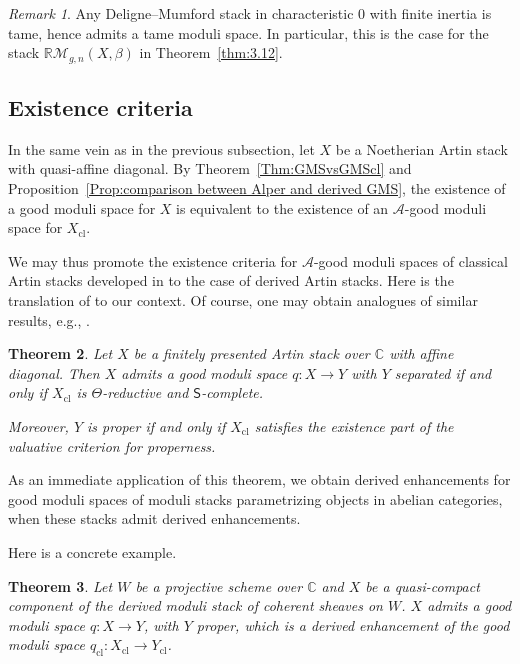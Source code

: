 \documentclass[a4paper,twoside,11pt]{amsart}
\theoremstyle{plain}
\newtheorem{theorem}{Theorem}[section]
\theoremstyle{definition}
\theoremstyle{remark}
\newtheorem{remark}[theorem]{Remark}
\numberwithin{equation}{section}
\newcommand{\CC}{\mathbb{C}} %
\newcommand{\cl}{\mathrm{cl}} %
\newcommand{\mM}{\mathcal{M}}
\begin{document}
\begin{remark} Any Deligne--Mumford stack in characteristic $0$ with finite inertia is tame, hence admits a tame moduli space. In particular, this is the case for the stack $\mathbb{R} \mM_{g,n}(X, \beta)$ in Theorem~\ref{thm:3.12}.
\end{remark}

\subsection{Existence criteria} In the same vein as in the previous subsection, let $X$ be a Noetherian Artin stack with quasi-affine diagonal. By Theorem~\ref{Thm:GMSvsGMScl} and Proposition~\ref{Prop:comparison between Alper and derived GMS}, the existence of a good moduli space for $X$ is equivalent to the existence of an $\mathcal{A}$-good moduli space for $X_\cl$.

We may thus promote the existence criteria for $\mathcal{A}$-good moduli spaces of classical Artin stacks developed in \cite{AlperExistence} to the case of derived Artin stacks. Here is the translation of \cite[Theorem~A]{AlperExistence} to our context. Of course, one may obtain analogues of similar results, e.g., \cite[Theorem~4.1]{AlperExistence}.

\begin{theorem}
Let $X$ be a finitely presented Artin stack over $\CC$ with affine diagonal. Then $X$ admits a good moduli space $q \colon X \to Y$ with $Y$ separated if and only if $X_\cl$ is $\Theta$-reductive and $\mathsf{S}$-complete.

Moreover, $Y$ is proper if and only if $X_\cl$ satisfies the existence part of the valuative criterion for properness.
\end{theorem}

As an immediate application of this theorem, we obtain derived enhancements for good moduli spaces of moduli stacks parametrizing objects in abelian categories, when these stacks admit derived enhancements. 

Here is a concrete example.

\begin{theorem}
Let $W$ be a projective scheme over $\CC$ and $X$ be a quasi-compact component of the derived moduli stack of coherent sheaves on $W$. $X$ admits a good moduli space $q \colon X \to Y$, with $Y$ proper, which is a derived enhancement of the good moduli space $q_\cl \colon X_\cl \to Y_\cl$.
\end{theorem}
\end{document}
